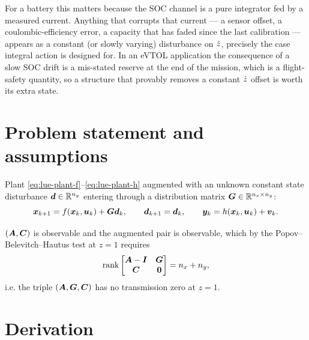 For a battery this matters because the SOC channel is a pure integrator fed by a measured
current.  Anything that corrupts that current --- a sensor offset, a coulombic-efficiency error,
a capacity that has faded since the last calibration --- appears as a constant (or slowly
varying) disturbance on $\dot{z}$, precisely the case integral action is designed for.  In an
eVTOL application the consequence of a slow SOC drift is a mis-stated reserve at the end of the
mission, which is a flight-safety quantity, so a structure that provably removes a constant
$\dot{z}$ offset is worth its extra state.

\section{Problem statement and assumptions}
Plant \eqref{eq:lue-plant-f}--\eqref{eq:lue-plant-h} augmented with an unknown constant state
disturbance $\bm{d}\in\mathbb{R}^{n_y}$ entering through a distribution matrix
$\bm{G}\in\mathbb{R}^{n_x\times n_y}$:
\begin{equation}
\bm{x}_{k+1} = f(\bm{x}_k,\bm{u}_k) + \bm{G}\bm{d}_k , \qquad \bm{d}_{k+1} = \bm{d}_k , \qquad
\bm{y}_k = h(\bm{x}_k,\bm{u}_k) + \bm{v}_k .
\label{eq:pi-plant}
\end{equation}
\begin{assumption}\label{as:pi-obs}
$(\bm{A},\bm{C})$ is observable and the augmented pair is observable, which by the
Popov--Belevitch--Hautus test at $z=1$ requires
\begin{equation}
\operatorname{rank}\begin{bmatrix}\bm{A}-\bm{I} & \bm{G}\\ \bm{C} & \bm{0}\end{bmatrix} = n_x + n_y ,
\label{eq:pi-hautus}
\end{equation}
i.e. the triple $(\bm{A},\bm{G},\bm{C})$ has no transmission zero at $z=1$.
\end{assumption}

\section{Derivation}

